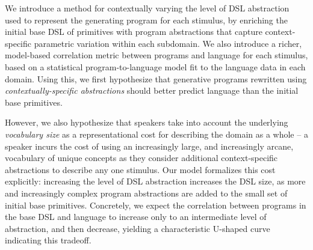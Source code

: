 \documentclass[10pt,letterpaper]{article}
\begin{document}
We introduce a method for contextually varying the level of DSL abstraction used to represent the generating program for each stimulus, by enriching the initial base DSL of primitives with program abstractions that capture context-specific parametric variation within each subdomain. We also introduce a richer, model-based correlation metric between programs and language for each stimulus, based on a statistical program-to-language model fit to the language data in each domain. Using this, we first hypothesize that generative programs rewritten using \textit{contextually-specific abstractions} should better predict language than the initial base primitives.

However, we also hypothesize that speakers take into account the underlying \textit{vocabulary size} as a representational cost for describing the domain as a whole -- a speaker incurs the cost of using an increasingly large, and increasingly arcane, vocabulary of unique concepts as they consider additional context-specific abstractions to describe any one stimulus. Our model formalizes this cost explicitly: increasing the level of DSL abstraction increases the DSL size, as more and increasingly complex program abstractions are added to the small set of initial base primitives. Concretely, we expect the correlation between programs in the base DSL and language to increase only to an intermediate level of abstraction, and then decrease, yielding a characteristic U-shaped curve indicating this tradeoff.


\end{document}
